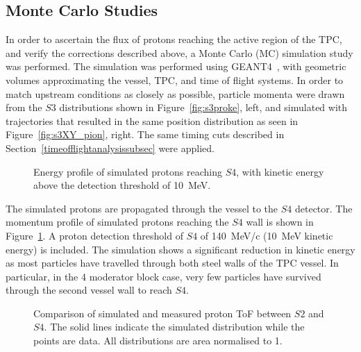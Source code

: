 \subsection{Monte Carlo Studies}
\label{sec:mcStudies}
In order to ascertain the flux of protons reaching the active region of the TPC, and verify the corrections described above, a Monte Carlo (MC) simulation study was performed.
The simulation was performed using GEANT4~\cite{brun1993geant}, with geometric volumes approximating the vessel, TPC, and time of flight systems.
In order to match upstream conditions as closely as possible, particle momenta were drawn from the $\mathit{S3}$ distributions shown in Figure~\ref{fig:s3proke}, left, and simulated with trajectories that resulted in the same position distribution as seen in Figure~\ref{fig:s3XY_pion}, right.
The same timing cuts described in Section~\ref{timeofflightanalysissubsec} were applied.

\begin{figure}[ht]
  \centering
     \begin{adjustbox}{max totalsize={\textwidth}{.3\textheight}, center}
      
    \end{adjustbox}
    \caption{Energy profile of simulated protons reaching $\mathit{S4}$, with kinetic energy above the detection threshold of 10~MeV.}
    \label{fig:MCS4}
\end{figure}

The simulated protons are propagated through the vessel to the $\mathit{S4}$ detector.
The momentum profile of simulated protons reaching the $\mathit{S4}$ wall is shown in Figure~\ref{fig:MCS4}.
A proton detection threshold of $\mathit{S4}$ of 140~MeV/c (10~MeV kinetic energy) is included.
The simulation shows a significant reduction in kinetic energy as most particles have travelled through both steel walls of the TPC vessel.
In particular, in the 4 moderator block case, very few particles have survived through the second vessel wall to reach $\mathit{S4}$.

\begin{figure}[h]
  \centering
  \begin{adjustbox}{max totalsize={.35\textheight}, center}
    
  \end{adjustbox}
  \caption{Comparison of simulated and measured proton ToF between $\mathit{S2}$ and $\mathit{S4}$. The solid lines indicate the simulated distribution while the points are data. All distributions are area normalised to 1.}
  \label{fig:tofMC}
\end{figure}

